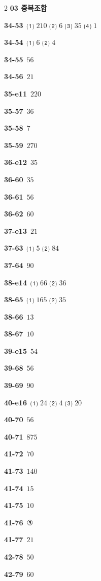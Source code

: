 \documentclass[10pt,a4paper]{article}
\begin{document}
\begin{multicols}{2}
\noindent\textbf{03 중복조합}\par\smallskip
\noindent\textbf{34-53}\ ⑴ $210$ ⑵ $6$ ⑶ $35$ ⑷ $1$\par
\noindent\textbf{34-54}\ ⑴ $6$ ⑵ $4$\par
\noindent\textbf{34-55}\ $56$\par
\noindent\textbf{34-56}\ $21$\par
\noindent\textbf{35-e11}\ $220$\par
\noindent\textbf{35-57}\ $36$\par
\noindent\textbf{35-58}\ $7$\par
\noindent\textbf{35-59}\ $270$\par
\noindent\textbf{36-e12}\ $35$\par
\noindent\textbf{36-60}\ $35$\par
\noindent\textbf{36-61}\ $56$\par
\noindent\textbf{36-62}\ $60$\par
\noindent\textbf{37-e13}\ $21$\par
\noindent\textbf{37-63}\ ⑴ $5$ ⑵ $84$\par
\noindent\textbf{37-64}\ $90$\par
\noindent\textbf{38-e14}\ ⑴ $66$ ⑵ $36$\par
\noindent\textbf{38-65}\ ⑴ $165$ ⑵ $35$\par
\noindent\textbf{38-66}\ $13$\par
\noindent\textbf{38-67}\ $10$\par
\noindent\textbf{39-e15}\ $54$\par
\noindent\textbf{39-68}\ $56$\par
\noindent\textbf{39-69}\ $90$\par
\noindent\textbf{40-e16}\ ⑴ $24$ ⑵ $4$ ⑶ $20$\par
\noindent\textbf{40-70}\ $56$\par
\noindent\textbf{40-71}\ $875$\par
\noindent\textbf{41-72}\ $70$\par
\noindent\textbf{41-73}\ $140$\par
\noindent\textbf{41-74}\ $15$\par
\noindent\textbf{41-75}\ $10$\par
\noindent\textbf{41-76}\ ③\par
\noindent\textbf{41-77}\ $21$\par
\noindent\textbf{42-78}\ $50$\par
\noindent\textbf{42-79}\ $60$\par

\end{multicols}
\end{document}
